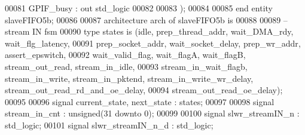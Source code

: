 \begin{DoxyCode}
00081         \textcolor{vhdlchar}{GPIF_busy}                   \textcolor{vhdlchar}{:} \textcolor{keywordflow}{out} \textcolor{comment}{std\_logic}
00082 
00083         \textcolor{vhdlchar}{)};
00084 
00085 \textcolor{keywordflow}{end} \textcolor{keywordflow}{entity} \textcolor{vhdlchar}{slaveFIFO5b};
00086 
00087 \textcolor{keywordflow}{architecture} arch \textcolor{keywordflow}{of} slaveFIFO5b is
00088 
00089 \textcolor{keyword}{--stream IN fsm}
00090 \textcolor{keywordflow}{type} \textcolor{vhdlchar}{states} \textcolor{keywordflow}{is} \textcolor{vhdlchar}{(}\textcolor{vhdlchar}{idle}\textcolor{vhdlchar}{,} \textcolor{vhdlchar}{prep\_thread\_addr}\textcolor{vhdlchar}{,} \textcolor{vhdlchar}{wait\_DMA\_rdy}\textcolor{vhdlchar}{,} \textcolor{vhdlchar}{wait\_flg\_latency}\textcolor{vhdlchar}{,} 
00091                      \textcolor{vhdlchar}{prep\_socket\_addr}\textcolor{vhdlchar}{,} \textcolor{vhdlchar}{wait\_socket\_delay}\textcolor{vhdlchar}{,} \textcolor{vhdlchar}{prep\_wr\_addr}\textcolor{vhdlchar}{,} \textcolor{vhdlchar}{assert\_epswitch}\textcolor{vhdlchar}{,} 
00092                      \textcolor{vhdlchar}{wait\_valid\_flag}\textcolor{vhdlchar}{,} \textcolor{vhdlchar}{wait\_flagA}\textcolor{vhdlchar}{,} \textcolor{vhdlchar}{wait\_flagB}\textcolor{vhdlchar}{,} \textcolor{vhdlchar}{stream\_out\_read}\textcolor{vhdlchar}{,} \textcolor{vhdlchar}{stream\_in\_idle}\textcolor{vhdlchar}{,} 
00093                      \textcolor{vhdlchar}{stream\_in\_wait\_flagb}\textcolor{vhdlchar}{,} \textcolor{vhdlchar}{stream\_in\_write}\textcolor{vhdlchar}{,} \textcolor{vhdlchar}{stream\_in\_pktend}\textcolor{vhdlchar}{,} \textcolor{vhdlchar}{stream\_in\_write\_wr\_delay}\textcolor{vhdlchar}{,} \textcolor{vhdlchar}{
      stream\_out\_read\_rd\_and\_oe\_delay}\textcolor{vhdlchar}{,}
00094                      \textcolor{vhdlchar}{stream\_out\_read\_oe\_delay}\textcolor{vhdlchar}{)};
00095                      
00096 \textcolor{keywordflow}{signal} \textcolor{vhdlchar}{current_state}\textcolor{vhdlchar}{,} \textcolor{vhdlchar}{next_state} \textcolor{vhdlchar}{:} \textcolor{vhdlchar}{states};
00097 
00098 \textcolor{keywordflow}{signal} \textcolor{vhdlchar}{stream_in_cnt}             \textcolor{vhdlchar}{:} \textcolor{comment}{unsigned}\textcolor{vhdlchar}{(}\textcolor{vhdllogic}{}\textcolor{vhdllogic}{31} \textcolor{keywordflow}{downto} \textcolor{vhdllogic}{}\textcolor{vhdllogic}{0}\textcolor{vhdlchar}{)};
00099 
00100 \textcolor{keywordflow}{signal} \textcolor{vhdlchar}{slwr_streamIN_n}     \textcolor{vhdlchar}{:} \textcolor{comment}{std\_logic};
00101 \textcolor{keywordflow}{signal} \textcolor{vhdlchar}{slwr_streamIN_n_d}   \textcolor{vhdlchar}{:} \textcolor{comment}{std\_logic};

\end{DoxyCode}
